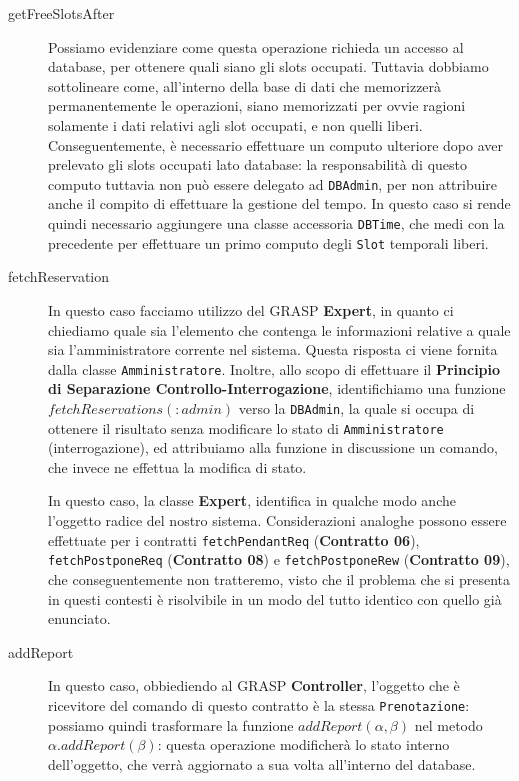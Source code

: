 \begin{description}

\item[getFreeSlotsAfter]

Possiamo evidenziare come questa operazione richieda un accesso al database,
per ottenere quali siano gli slots occupati. Tuttavia dobbiamo sottolineare
come, all'interno della base di dati che memorizzerà permanentemente le
operazioni, siano memorizzati per ovvie ragioni solamente i dati relativi agli
slot occupati, e non quelli liberi. Conseguentemente, è necessario effettuare
un computo ulteriore dopo aver prelevato gli slots occupati lato database:
la responsabilità di questo computo tuttavia non può essere delegato ad
\texttt{DBAdmin}, per non attribuire anche il compito di effettuare la gestione
del tempo. In questo caso si rende quindi necessario aggiungere una classe 
accessoria \texttt{DBTime}, che medi con la precedente per effettuare un primo
computo degli \texttt{Slot} temporali liberi.
\bigskip

\item[fetchReservation]

In questo caso facciamo utilizzo del GRASP \textbf{Expert}, in quanto ci chiediamo
quale sia l'elemento che contenga le informazioni relative a quale sia l'amministratore
corrente nel sistema. Questa risposta ci viene fornita dalla classe 
\texttt{Amministratore}. Inoltre, allo scopo di effettuare il \textbf{Principio di
Separazione Controllo-Interrogazione}, identifichiamo una funzione
$fetchReservations(:admin)$ verso la \texttt{DBAdmin}, la quale si occupa di ottenere
il risultato senza modificare lo stato di \texttt{Amministratore} (interrogazione), 
ed attribuiamo alla funzione in discussione un comando, che invece ne effettua 
la modifica di stato. 

In questo caso, la classe \textbf{Expert}, identifica in qualche modo anche l'oggetto
radice del nostro sistema. Considerazioni analoghe possono essere effettuate
per i contratti \texttt{fetchPendantReq} (\textbf{Contratto 06}), \texttt{fetchPostponeReq}
(\textbf{Contratto 08}) e \texttt{fetchPostponeRew} (\textbf{Contratto 09}), che conseguentemente
non tratteremo, visto che il problema che si presenta in questi contesti è
risolvibile in un modo del tutto identico con quello già enunciato.
\bigskip

\item[addReport]

In questo caso, obbiediendo al GRASP \textbf{Controller}, l'oggetto che è ricevitore
del comando di questo contratto è la stessa \texttt{Prenotazione}: possiamo quindi
trasformare la funzione $addReport(\alpha,\beta)$ nel metodo $\alpha.addReport(\beta)$:
questa operazione modificherà lo stato interno dell'oggetto, che verrà aggiornato
a sua volta all'interno del database.
\bigskip


\end{description}
